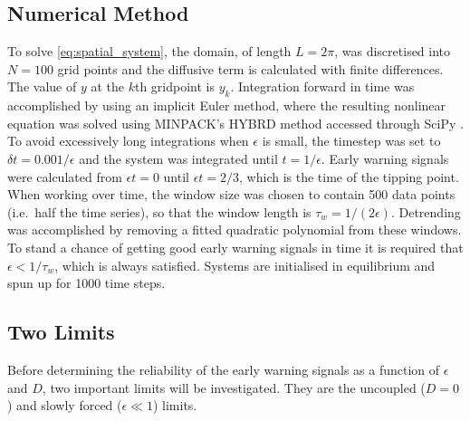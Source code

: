 \subsection{Numerical Method}
To solve \cref{eq:spatial_system}, the domain, of length $L = 2\pi$, was discretised into $N = 100$ grid
points and 
the diffusive term is calculated with finite differences. The value of $y$ at the $k$th gridpoint is $y_k$. Integration forward in time was accomplished by 
using an implicit Euler method, where the resulting nonlinear equation was solved using 
MINPACK's HYBRD method accessed through SciPy \parencite{Virtanen2020}. To avoid excessively long integrations when $\epsilon$ is small,
the timestep was set to $\delta t = 0.001/\epsilon$ and the system was integrated until $t=1/\epsilon$. Early warning signals were calculated
from $\epsilon t=0$ until $\epsilon t=2/3$, which is the 
time of the tipping point. When working over time, the window size was chosen to 
contain 500 data points (i.e.\ half the time series),
so that the window length is $\tau_w = 1/(2\epsilon)$. Detrending was accomplished by removing a fitted quadratic polynomial from these windows.
To stand a chance of getting good early warning
signals in time it is required that $\epsilon < 1/\tau_w$, which is always satisfied.
Systems are initialised in equilibrium and spun up for 1000 time steps.

\subsection{Two Limits}
Before determining the reliability of the early warning signals as a function of $\epsilon$ and $D$, two important limits will be investigated. They are the uncoupled ($D = 0$)
and slowly forced ($\epsilon \ll 1$) limits.

